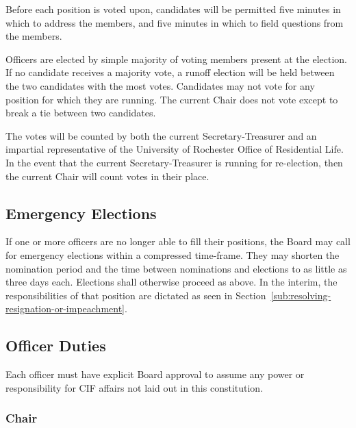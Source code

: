 	Before each position is voted upon, candidates will be permitted five minutes in which to address the members, and five minutes in which to field questions from the members.

	Officers are elected by simple majority of voting members present at the election. If no candidate receives a majority vote, a runoff election will be held between the two candidates with the most votes. Candidates may not vote for any position for which they are running. The current Chair does not vote except to break a tie between two candidates.

	The votes will be counted by both the current Secretary-Treasurer and an impartial representative of the University of Rochester Office of Residential Life. In the event that the current Secretary-Treasurer is running for re-election, then the current Chair will count votes in their place.

	\subsection{Emergency Elections}

	If one or more officers are no longer able to fill their positions, the Board may call for emergency elections within a compressed time-frame. They may shorten the nomination period and the time between nominations and elections to as little as three days each. Elections shall otherwise proceed as above. In the interim, the responsibilities of that position are dictated as seen in Section~\ref{sub:resolving-resignation-or-impeachment}.



	\subsection{Officer Duties}

	Each officer must have explicit Board approval to assume any power or responsibility for CIF affairs not laid out in this constitution.



		\subsubsection{Chair}\label{ssub:chair}

